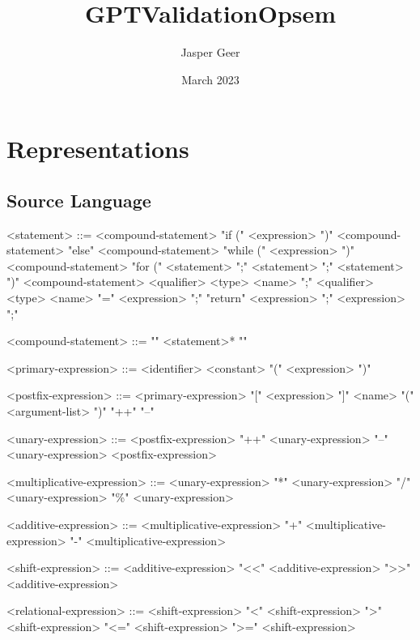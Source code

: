 \documentclass{article}
\title{GPTValidationOpsem}
\author{Jasper Geer}
\date{March 2023}
\begin{document}

\section{Representations}
\subsection{Source Language}
\begin{grammar}
<statement> ::= <compound-statement>
  \alt "if (" <expression> ")" <compound-statement> "else" <compound-statement>
  \alt "while (" <expression> ")" <compound-statement>
  \alt "for (" <statement> ";" <statement> ";" <statement> ")" <compound-statement>
  \alt <qualifier> <type> <name> ";"
  \alt <qualifier> <type> <name> "=" <expression> ";"
  \alt "return" <expression> ";"
  \alt <expression> ";"

<compound-statement> ::= "{" <statement>* "}"

<primary-expression> ::= <identifier>
  \alt <constant>
  \alt "(" <expression> ")"

<postfix-expression> ::= <primary-expression>
   "[" <expression> "]"
  \alt <name> "(" <argument-list> ")"
   "++"
   "--"

<unary-expression> ::= <postfix-expression>
  \alt "++" <unary-expression>
  \alt "--" <unary-expression>
   <postfix-expression>

<multiplicative-expression> ::= <unary-expression>
   "*" <unary-expression>
   "/" <unary-expression>
   "\%" <unary-expression>

<additive-expression> ::= <multiplicative-expression>
   "+" <multiplicative-expression>
   "-" <multiplicative-expression>

<shift-expression> ::= <additive-expression>
   "<<" <additive-expression>
   ">>" <additive-expression>
  
<relational-expression> ::= <shift-expression>
   "<" <shift-expression>
   ">" <shift-expression>
   "<=" <shift-expression>
   ">=" <shift-expression>


\end{grammar}
\end{document}
